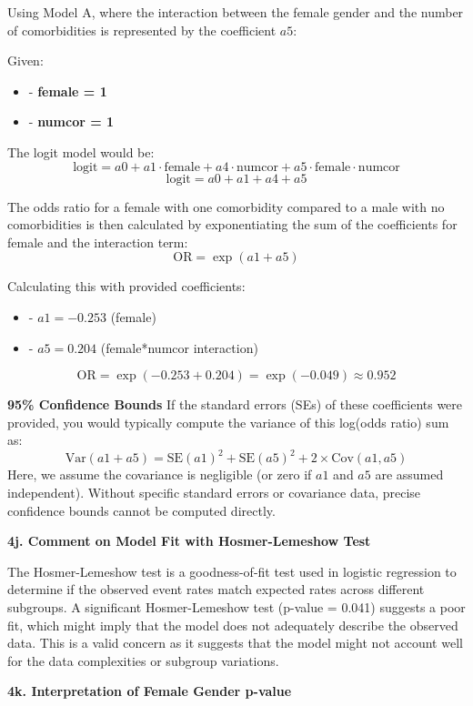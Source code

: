 \documentclass{article}
\begin{document}
Using Model A, where the interaction between the female gender and the number of comorbidities is represented by the coefficient \( a5 \):

Given:
\begin{itemize}
    \item - \textbf{female = 1}
    \item - \textbf{numcor = 1}
\end{itemize}

The logit model would be:
\[ \text{logit} = a0 + a1 \cdot \text{female} + a4 \cdot \text{numcor} + a5 \cdot \text{female} \cdot \text{numcor} \]
\[ \text{logit} = a0 + a1 + a4 + a5 \]

The odds ratio for a female with one comorbidity compared to a male with no comorbidities is then calculated by exponentiating the sum of the coefficients for female and the interaction term:
\[ \text{OR} = \exp(a1 + a5) \]

Calculating this with provided coefficients:
\begin{itemize}
    \item - \( a1 = -0.253 \) (female)
    \item - \( a5 = 0.204 \) (female*numcor interaction)
\end{itemize}

\[ \text{OR} = \exp(-0.253 + 0.204) = \exp(-0.049) \approx 0.952 \]

\textbf{95\% Confidence Bounds}
If the standard errors (SEs) of these coefficients were provided, you would typically compute the variance of this log(odds ratio) sum as:
\[ \text{Var}(a1 + a5) = \text{SE}(a1)^2 + \text{SE}(a5)^2 + 2 \times \text{Cov}(a1, a5) \]
Here, we assume the covariance is negligible (or zero if \(a1\) and \(a5\) are assumed independent). Without specific standard errors or covariance data, precise confidence bounds cannot be computed directly.

\textbf{4j. Comment on Model Fit with Hosmer-Lemeshow Test}

The Hosmer-Lemeshow test is a goodness-of-fit test used in logistic regression to determine if the observed event rates match expected rates across different subgroups. A significant Hosmer-Lemeshow test (p-value = 0.041) suggests a poor fit, which might imply that the model does not adequately describe the observed data. This is a valid concern as it suggests that the model might not account well for the data complexities or subgroup variations.

\textbf{4k. Interpretation of Female Gender p-value}
\end{document}
